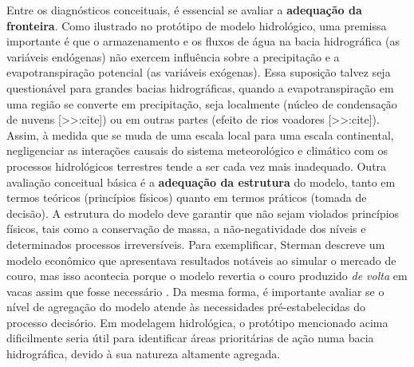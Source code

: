 \documentclass[./main.tex]{subfiles}
\begin{document}
\par Entre os diagnósticos conceituais, é essencial se avaliar a \textbf{adequação da fronteira}. Como ilustrado no protótipo de modelo hidrológico, uma premissa importante é que o armazenamento e os fluxos de água na bacia hidrográfica (as variáveis endógenas) não exercem influência sobre a precipitação e a evapotranspiração potencial (as variáveis exógenas). Essa suposição talvez seja questionável para grandes bacias hidrográficas, quando a evapotranspiração em uma região se converte em precipitação, seja localmente (núcleo de condensação de nuvens [>>:cite]) ou em outras partes (efeito de rios voadores [>>:cite]). Assim, à medida que se muda de uma escala local para uma escala continental, negligenciar as interações causais do sistema meteorológico e climático com os processos hidrológicos terrestres tende a ser cada vez mais inadequado. Outra avaliação conceitual básica é a \textbf{adequação da estrutura} do modelo, tanto em termos teóricos (princípios físicos) quanto em termos práticos (tomada de decisão). A estrutura do modelo deve garantir que não sejam violados princípios físicos, tais como a conservação de massa, a não-negatividade dos níveis e determinados processos irreversíveis. Para exemplificar, Sterman descreve um modelo econômico que apresentava resultados notáveis ao simular o mercado de couro, mas isso acontecia porque o modelo revertia o couro produzido \textit{de volta} em vacas assim que fosse necessário \cite{sterman2000}. Da mesma forma, é importante avaliar se o nível de agregação do modelo atende às necessidades pré-estabelecidas do processo decisório. Em modelagem hidrológica, o protótipo mencionado acima dificilmente seria útil para identificar áreas prioritárias de ação numa bacia hidrográfica, devido à sua natureza altamente agregada. 
\end{document}
